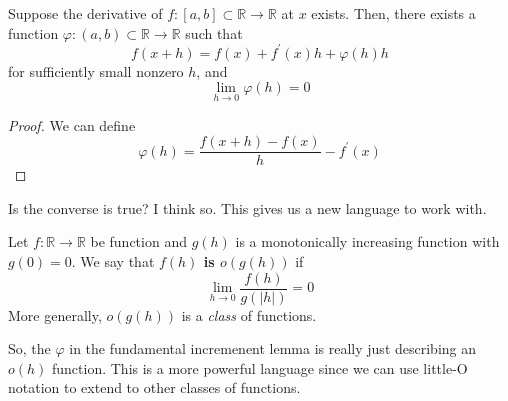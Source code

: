   \begin{lemma}
    Suppose the derivative of $f: [a, b] \subset \mathbb{R} \to \mathbb{R}$ at $x$ exists. Then, there exists a function $\varphi: (a, b) \subset \mathbb{R} \to \mathbb{R}$ such that 
    \begin{equation}
      f(x + h) = f(x) + f^\prime (x) h + \varphi(h) h
    \end{equation}
    for sufficiently small nonzero $h$, and 
    \begin{equation}
      \lim_{h \to 0} \varphi(h) = 0
    \end{equation}
  \end{lemma}
  \begin{proof}
    We can define 
    \begin{equation}
      \varphi(h) = \frac{f(x + h) - f(x)}{h} - f^\prime (x)
    \end{equation}
  \end{proof} 

  Is the converse is true? I think so. This gives us a new language to work with. 

  \begin{definition}
    Let $f: \mathbb{R} \to \mathbb{R}$ be function and $g(h)$ is a monotonically increasing function with $g(0) = 0$. We say that \textbf{$f(h)$ is $o(g(h))$} if 
    \begin{equation}
      \lim_{h \to 0} \frac{f(h)}{g(|h|)} = 0
    \end{equation}
    More generally, $o(g(h))$ is a \textit{class} of functions. 
  \end{definition} 
  
  So, the $\varphi$ in the fundamental incremenent lemma is really just describing an $o(h)$ function. This is a more powerful language since we can use little-O notation to extend to other classes of functions. 

